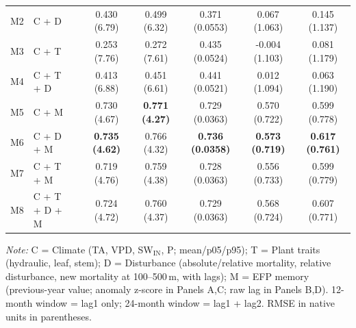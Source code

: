 \begin{table}[htbp]
\begin{tabular}{llcccccc}
M2 & C + D &  & 0.430 (6.79) & 0.499 (6.32) & 0.371 (0.0553) & 0.067 (1.063) & 0.145 (1.137) \\
M3 & C + T &  & 0.253 (7.76) & 0.272 (7.61) & 0.435 (0.0524) & -0.004 (1.103) & 0.081 (1.179) \\
M4 & C + T + D &  & 0.413 (6.88) & 0.451 (6.61) & 0.441 (0.0521) & 0.012 (1.094) & 0.063 (1.190) \\
M5 & C + M &  & 0.730 (4.67) & \textbf{0.771 (4.27)} & 0.729 (0.0363) & 0.570 (0.722) & 0.599 (0.778) \\
M6 & C + D + M &  & \textbf{0.735 (4.62)} & 0.766 (4.32) & \textbf{0.736 (0.0358)} & \textbf{0.573 (0.719)} & \textbf{0.617 (0.761)} \\
M7 & C + T + M &  & 0.719 (4.76) & 0.759 (4.38) & 0.728 (0.0363) & 0.556 (0.733) & 0.599 (0.779) \\
M8 & C + T + D + M &  & 0.724 (4.72) & 0.760 (4.37) & 0.729 (0.0363) & 0.568 (0.724) & 0.607 (0.771) \\
\midrule
\bottomrule
\end{tabular}
\vspace{2pt}
\begin{minipage}{\linewidth}
\footnotesize
\textit{Note:} C = Climate (TA, VPD, SW$_\mathrm{IN}$, P; mean/p05/p95); T = Plant traits (hydraulic, leaf, stem); D = Disturbance (absolute/relative mortality, relative disturbance, new mortality at 100--500\,m, with lags); M = EFP memory (previous-year value; anomaly z-score in Panels A,C; raw lag in Panels B,D). 12-month window = lag1 only; 24-month window = lag1 + lag2. RMSE in native units in parentheses.
\end{minipage}
\end{table}

